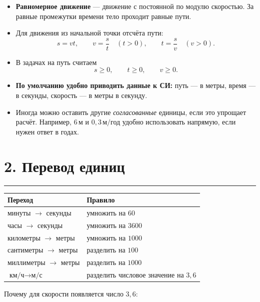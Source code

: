 \documentclass[a4paper,12pt]{article}
\newcommand{\sectionline}{%
  \par\vspace{0.15em}%
  \noindent\textcolor{lightaccent}{\rule{\linewidth}{0.7pt}}%
  \par\vspace{0.35em}%
}
\newcommand{\key}[1]{\textcolor{darkaccent}{\textbf{#1}}}
\newcommand{\unit}[1]{\,\text{#1}}
\begin{document}
\begin{itemize}

  \item
  \key{Равномерное движение} --- движение с постоянной по модулю скоростью.
  За равные промежутки времени тело проходит равные пути.

  \item
  Для движения из начальной точки отсчёта пути:
  \[
    s=vt,
    \qquad
    v=\frac{s}{t}\quad (t>0),
    \qquad
    t=\frac{s}{v}\quad (v>0).
  \]

  \item
  В задачах на путь считаем
  \[
    s\ge0,\qquad t\ge0,\qquad v\ge0.
  \]

  \item
  \key{По умолчанию удобно приводить данные к СИ:}
  путь --- в метры,
  время --- в секунды,
  скорость --- в метры в секунду.

  \item
  Иногда можно оставить другие \emph{согласованные} единицы,
  если это упрощает расчёт.
  Например,
  $6\unit{м}$ и $0{,}3\unit{м/год}$
  удобно использовать напрямую,
  если нужен ответ в годах.

\end{itemize}

\section*{2. Перевод единиц}
\sectionline

\renewcommand{\arraystretch}{1.35}

\begin{table}[h]
\centering
\begin{tabularx}{\linewidth}{@{}X X@{}}
\toprule
\textbf{Переход} & \textbf{Правило} \\
\midrule
минуты $\to$ секунды
&
умножить на $60$
\\
часы $\to$ секунды
&
умножить на $3600$
\\
километры $\to$ метры
&
умножить на $1000$
\\
сантиметры $\to$ метры
&
разделить на $100$
\\
миллиметры $\to$ метры
&
разделить на $1000$
\\
$\text{км/ч}\to\text{м/с}$
&
разделить числовое значение на $3{,}6$
\\
\bottomrule
\end{tabularx}
\end{table}

Почему для скорости появляется число $3{,}6$:
\end{document}
